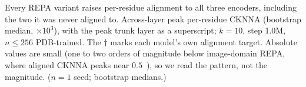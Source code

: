 \begin{table}[tbp]
\centering
\small
\setlength{\tabcolsep}{8pt}

\caption{Every REPA variant raises per-residue alignment to all three encoders, including the two it was never aligned to. Across-layer peak per-residue CKNNA (bootstrap median, $\times 10^{3}$), with the peak trunk layer as a superscript; $k{=}10$, step 1.0M, $n{\le}256$ PDB-trained. The $\dagger$ marks each model's own alignment target. Absolute values are small (one to two orders of magnitude below image-domain REPA, where aligned CKNNA peaks near $0.5$~\cite{REPA}), so we read the pattern, not the magnitude. ($n{=}1$ seed; bootstrap medians.)}
\label{tab:cknna-matrix}
\end{table}
